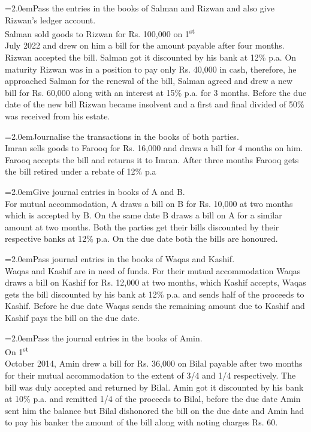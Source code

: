 \documentclass[11pt,a4paper]{article}
\newcommand{\lqn}[2]{\Needspace{6\baselineskip}\par\medskip\noindent\hangindent=2.0em\hangafter=1\makebox[2.0em][l]{\textbf{#1.}}#2\par}
\begin{document}
\lqn{46}{Pass the entries in the books of Salman and Rizwan and also give Rizwan’s ledger account.\\
Salman sold goods to Rizwan for Rs. 100,000 on 1\textsuperscript{st}\\
July 2022 and drew on him a bill for the amount payable after four months. Rizwan accepted the bill. Salman got it discounted by his bank at 12\% p.a. On maturity Rizwan was in a position to pay only Rs. 40,000 in cash, therefore, he approached Salman for the renewal of the bill, Salman agreed and drew a new bill for Rs. 60,000 along with an interest at 15\% p.a. for 3 months. Before the due date of the new bill Rizwan became insolvent and a first and final divided of 50\% was received from his estate.\par
}
\lqn{47}{Journalise the transactions in the books of both parties.\\
Imran sells goods to Farooq for Rs. 16,000 and draws a bill for 4 months on him. Farooq accepts the bill and returns it to Imran. After three months Farooq gets the bill retired under a rebate of 12\% p.a\par
}
\lqn{48}{Give journal entries in books of A and B.\\
For mutual accommodation, A draws a bill on B for Rs. 10,000 at two months which is accepted by B. On the same date B draws a bill on A for a similar amount at two months. Both the parties get their bills discounted by their respective banks at 12\% p.a. On the due date both the bills are honoured.\par
}
\lqn{49}{Pass journal entries in the books of Waqas and Kashif.\\
Waqas and Kashif are in need of funds. For their mutual accommodation Waqas draws a bill on Kashif for Rs. 12,000 at two months, which Kashif accepts, Waqas gets the bill discounted by his bank at 12\% p.a. and sends half of the proceeds to Kashif. Before he due date Waqas sends the remaining amount due to Kashif and Kashif pays the bill on the due date.\par
}
\lqn{50}{Pass the journal entries in the books of Amin.\\
On 1\textsuperscript{st}\\
October 2014, Amin drew a bill for Rs. 36,000 on Bilal payable after two months for their mutual accommodation to the extent of 3/4 and 1/4 respectively. The bill was duly accepted and returned by Bilal. Amin got it discounted by his bank at 10\% p.a. and remitted 1/4 of the proceeds to Bilal, before the due date Amin sent him the balance but Bilal dishonored the bill on the due date and Amin had to pay his banker the amount of the bill along with noting charges Rs. 60.\par
}
\end{document}
